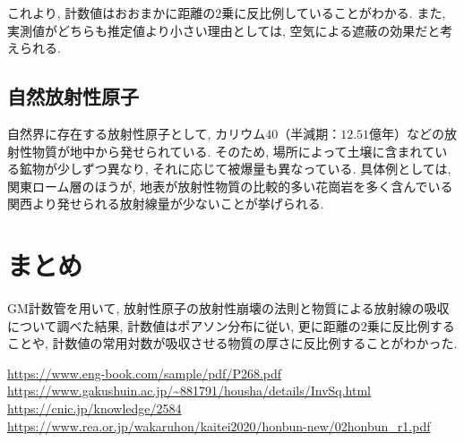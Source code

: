 \documentclass{jarticle}
\begin{document}
これより, 計数値はおおまかに距離の$2$乗に反比例していることがわかる.
また, 実測値がどちらも推定値より小さい理由としては, 空気による遮蔽の効果だと考えられる\cite{2乗に反比例}.


\subsection{自然放射性原子}

自然界に存在する放射性原子として, カリウム$40$（半減期：$12.51$億年\cite{K40半減期}）などの放射性物質が地中から発せられている.
そのため, 場所によって土壌に含まれている鉱物が少しずつ異なり, それに応じて被爆量も異なっている.
具体例としては, 関東ローム層のほうが, 地表が放射性物質の比較的多い花崗岩を多く含んでいる関西より発せられる放射線量が少ないことが挙げられる\cite{さまざまな被爆}.



\section{まとめ}

GM計数管を用いて, 放射性原子の放射性崩壊の法則と物質による放射線の吸収について調べた結果, 計数値はポアソン分布に従い, 更に距離の$2$乗に反比例することや, 計数値の常用対数が吸収させる物質の厚さに反比例することがわかった.


\begin{thebibliography}{99}

   \url{https://www.eng-book.com/sample/pdf/P268.pdf}
   \url{https://www.gakushuin.ac.jp/~881791/housha/details/InvSq.html}
   \url{https://cnic.jp/knowledge/2584}
   \url{https://www.rea.or.jp/wakaruhon/kaitei2020/honbun-new/02honbun_r1.pdf}

\end{thebibliography}
\end{document}
